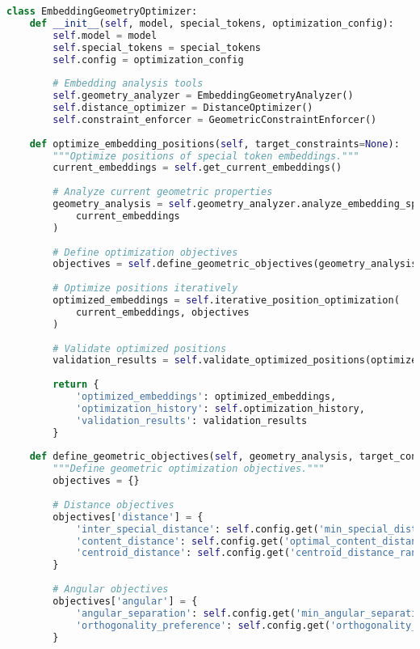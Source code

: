 \begin{lstlisting}[language=Python, caption=Geometric embedding optimization framework]
class EmbeddingGeometryOptimizer:
    def __init__(self, model, special_tokens, optimization_config):
        self.model = model
        self.special_tokens = special_tokens
        self.config = optimization_config
        
        # Embedding analysis tools
        self.geometry_analyzer = EmbeddingGeometryAnalyzer()
        self.distance_optimizer = DistanceOptimizer()
        self.constraint_enforcer = GeometricConstraintEnforcer()
        
    def optimize_embedding_positions(self, target_constraints=None):
        """Optimize positions of special token embeddings."""
        current_embeddings = self.get_current_embeddings()
        
        # Analyze current geometric properties
        geometry_analysis = self.geometry_analyzer.analyze_embedding_space(
            current_embeddings
        )
        
        # Define optimization objectives
        objectives = self.define_geometric_objectives(geometry_analysis, target_constraints)
        
        # Optimize positions iteratively
        optimized_embeddings = self.iterative_position_optimization(
            current_embeddings, objectives
        )
        
        # Validate optimized positions
        validation_results = self.validate_optimized_positions(optimized_embeddings)
        
        return {
            'optimized_embeddings': optimized_embeddings,
            'optimization_history': self.optimization_history,
            'validation_results': validation_results
        }
    
    def define_geometric_objectives(self, geometry_analysis, target_constraints):
        """Define geometric optimization objectives."""
        objectives = {}
        
        # Distance objectives
        objectives['distance'] = {
            'inter_special_distance': self.config.get('min_special_distance', 0.5),
            'content_distance': self.config.get('optimal_content_distance', 1.0),
            'centroid_distance': self.config.get('centroid_distance_range', (0.8, 1.2))
        }
        
        # Angular objectives
        objectives['angular'] = {
            'angular_separation': self.config.get('min_angular_separation', 0.3),
            'orthogonality_preference': self.config.get('orthogonality_weight', 0.1)
        }
        

\end{lstlisting}

